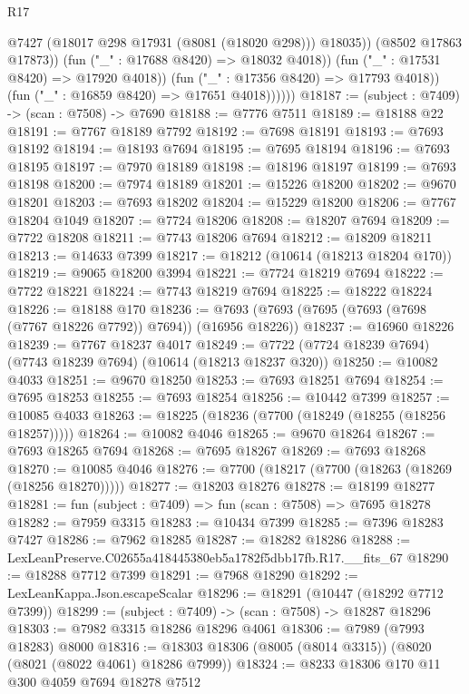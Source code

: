 \begin{lexlean}{R17}
\begin{coremodule}
                          @7427
                          (@18017 @298 @17931 (@8081 (@18020 @298)))
                          @18035))
                      (@8502 @17863 @17873))
                    (fun ("_" : @17688 @8420) => @18032 @4018))
                  (fun ("_" : @17531 @8420) => @17920 @4018))
                (fun ("_" : @17356 @8420) => @17793 @4018))
              (fun ("_" : @16859 @8420) => @17651 @4018))))))
@18187 := (subject : @7409) -> (scan : @7508) -> @7690
@18188 := @7776 @7511
@18189 := @18188 @22
@18191 := @7767 @18189 @7792
@18192 := @7698 @18191
@18193 := @7693 @18192
@18194 := @18193 @7694
@18195 := @7695 @18194
@18196 := @7693 @18195
@18197 := @7970 @18189
@18198 := @18196 @18197
@18199 := @7693 @18198
@18200 := @7974 @18189
@18201 := @15226 @18200
@18202 := @9670 @18201
@18203 := @7693 @18202
@18204 := @15229 @18200
@18206 := @7767 @18204 @1049
@18207 := @7724 @18206
@18208 := @18207 @7694
@18209 := @7722 @18208
@18211 := @7743 @18206 @7694
@18212 := @18209 @18211
@18213 := @14633 @7399
@18217 := @18212 (@10614 (@18213 @18204 @170))
@18219 := @9065 @18200 @3994
@18221 := @7724 @18219 @7694
@18222 := @7722 @18221
@18224 := @7743 @18219 @7694
@18225 := @18222 @18224
@18226 := @18188 @170
@18236 := @7693 (@7693 (@7695 (@7693 (@7698 (@7767 @18226 @7792)) @7694)) (@16956 @18226))
@18237 := @16960 @18226
@18239 := @7767 @18237 @4017
@18249 := @7722 (@7724 @18239 @7694) (@7743 @18239 @7694) (@10614 (@18213 @18237 @320))
@18250 := @10082 @4033
@18251 := @9670 @18250
@18253 := @7693 @18251 @7694
@18254 := @7695 @18253
@18255 := @7693 @18254
@18256 := @10442 @7399
@18257 := @10085 @4033
@18263 := @18225 (@18236 (@7700 (@18249 (@18255 (@18256 @18257)))))
@18264 := @10082 @4046
@18265 := @9670 @18264
@18267 := @7693 @18265 @7694
@18268 := @7695 @18267
@18269 := @7693 @18268
@18270 := @10085 @4046
@18276 := @7700 (@18217 (@7700 (@18263 (@18269 (@18256 @18270)))))
@18277 := @18203 @18276
@18278 := @18199 @18277
@18281 := fun (subject : @7409) => fun (scan : @7508) => @7695 @18278
@18282 := @7959 @3315
@18283 := @10434 @7399
@18285 := @7396 @18283 @7427
@18286 := @7962 @18285
@18287 := @18282 @18286
@18288 := LexLeanPreserve.C02655a418445380eb5a1782f5dbb17fb.R17.__fits_67
@18290 := @18288 @7712 @7399
@18291 := @7968 @18290
@18292 := LexLeanKappa.Json.escapeScalar
@18296 := @18291 (@10447 (@18292 @7712 @7399))
@18299 := (subject : @7409) -> (scan : @7508) -> @18287 @18296
@18303 := @7982 @3315 @18286 @18296 @4061
@18306 := @7989 (@7993 @18283) @8000
@18316 := @18303 @18306 (@8005 (@8014 @3315)) (@8020 (@8021 (@8022 @4061) @18286 @7999))
@18324 := @8233 @18306 @170 @11 @300 @4059 @7694 @18278 @7512

\end{coremodule}
\end{lexlean}
